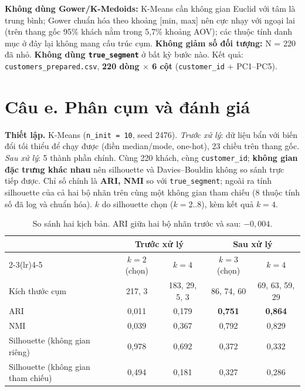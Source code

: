 \documentclass[12pt,a4paper]{article}
\newcommand{\code}[1]{\texttt{#1}}
\begin{document}
\textbf{Không dùng Gower/K-Medoids:} K-Means cần không gian Euclid với tâm là trung bình; Gower chuẩn hóa theo khoảng [min, max] nên cực nhạy với ngoại lai (trên thang gốc 95\% khách nằm trong 5,7\% khoảng AOV); các thuộc tính danh mục ở đây lại không mang cấu trúc cụm. \textbf{Không giảm số đối tượng:} N = 220 đã nhỏ. \textbf{Không dùng \code{true\_segment}} ở bất kỳ bước nào. Kết quả: \code{customers\_prepared.csv}, \textbf{220 dòng $\times$ 6 cột} (\code{customer\_id} + PC1--PC5).

\section{Câu e. Phân cụm và đánh giá}

\textbf{Thiết lập.} K-Means (\code{n\_init = 10}, seed 2476). \emph{Trước xử lý}: dữ liệu bẩn với biến đổi tối thiểu để chạy được (điền median/mode, one-hot), 23 chiều trên thang gốc. \emph{Sau xử lý}: 5 thành phần chính. Cùng 220 khách, cùng \code{customer\_id}; \textbf{không gian đặc trưng khác nhau} nên silhouette và Davies--Bouldin không so sánh trực tiếp được. Chỉ số chính là \textbf{ARI, NMI} so với \code{true\_segment}; ngoài ra tính silhouette của cả hai bộ nhãn trên cùng một không gian tham chiếu (8 thuộc tính số đã log và chuẩn hóa). $k$ do silhouette chọn ($k = 2..8$), kèm kết quả $k = 4$.

\begin{table}[H]\centering\small
\begin{tabular}{@{}lcccc@{}}\toprule
 & \multicolumn{2}{c}{Trước xử lý} & \multicolumn{2}{c}{Sau xử lý}\\\cmidrule(lr){2-3}\cmidrule(lr){4-5}
 & $k = 2$ (chọn) & $k = 4$ & $k = 3$ (chọn) & $k = 4$\\\midrule
Kích thước cụm & 217, 3 & 183, 29, 5, 3 & 86, 74, 60 & 69, 63, 59, 29\\
ARI & 0,011 & 0,179 & \textbf{0,751} & \textbf{0,864}\\
NMI & 0,039 & 0,367 & 0,792 & 0,829\\
Silhouette (không gian riêng) & 0,978 & 0,692 & 0,372 & 0,332\\
Silhouette (không gian tham chiếu) & 0,494 & 0,181 & 0,327 & 0,286\\\bottomrule
\end{tabular}
\caption{So sánh hai kịch bản. ARI giữa hai bộ nhãn trước và sau: $-0{,}004$.}
\end{table}
\end{document}
